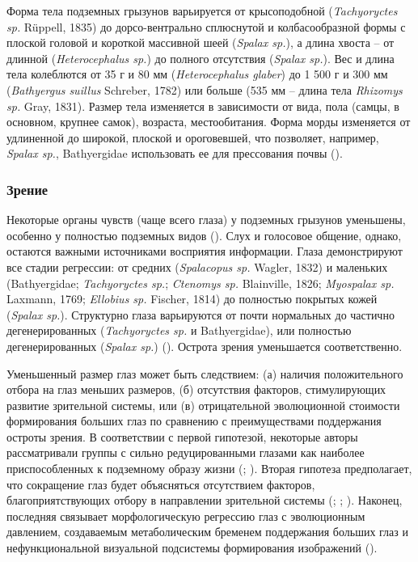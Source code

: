 Форма тела подземных грызунов варьируется от крысоподобной (\textit{Tachyoryctes sp.} Rüppell, 1835) до дорсо-вентрально сплюснутой и колбасообразной формы с плоской головой и короткой массивной шеей (\textit{Spalax sp.}), а длина хвоста -- от длинной (\textit{Heterocephalus sp.}) до полного отсутствия (\textit{Spalax sp.}). Вес и длина тела колеблются от 35 г и 80 мм (\textit{Heterocephalus glaber}) до 1 500 г и 300 мм (\textit{Bathyergus suillus} Schreber, 1782) или больше (535 мм -- длина тела \textit{Rhizomys sp.} Gray, 1831). Размер тела  изменяется в зависимости от вида, пола (самцы, в основном, крупнее самок), возраста, местообитания. Форма морды изменяется от удлиненной до широкой, плоской и ороговевшей, что позволяет, например, \textit{Spalax sp.}, Bathyergidae использовать ее для прессования почвы (\cite{Lacey2000}). 

\subsubsection{Зрение}

Некоторые органы чувств (чаще всего глаза) у подземных грызунов уменьшены, особенно у полностью подземных видов (\cite{REICHMAN1990}). Слух и голосовое общение, однако, остаются важными источниками восприятия информации. Глаза демонстрируют все стадии регрессии: от средних (\textit{Spalacopus sp.} Wagler, 1832) и маленьких (Bathyergidae; \textit{Tachyoryctes sp.}; \textit{Ctenomys sp.} Blainville, 1826; \textit{Myospalax sp.} Laxmann, 1769; \textit{Ellobius sp.} Fischer, 1814) до полностью покрытых кожей (\textit{Spalax sp.}). Структурно глаза варьируются от почти нормальных до частично дегенерированных (\textit{Tachyoryctes sp.} и Bathyergidae), или полностью дегенерированных (\textit{Spalax sp.}) (\cite{Nevo1990}). Острота зрения уменьшается соответственно. 

Уменьшенный размер глаз может быть следствием: (а) наличия положительного отбора на глаз меньших размеров, (б) отсутствия факторов, стимулирующих развитие зрительной системы, или (в) отрицательной эволюционной стоимости формирования больших глаз по сравнению с преимуществами поддержания остроты зрения. В соответствии с первой гипотезой, некоторые авторы рассматривали группы с сильно редуцированными глазами как наиболее приспособленных к подземному образу жизни (\cite{Darwin1872}; \cite{Cooper1993}). Вторая гипотеза предполагает, что сокращение глаз будет объясняться отсутствием факторов, благоприятствующих отбору в направлении зрительной системы (\cite{Wright1964}; \cite{Wilkens1971}; \cite{Burda1990}). Наконец, последняя связывает морфологическую регрессию глаз с эволюционным давлением, создаваемым метаболическим бременем поддержания больших глаз и нефункциональной визуальной подсистемы формирования изображений (\cite{Cooper1993}). 

